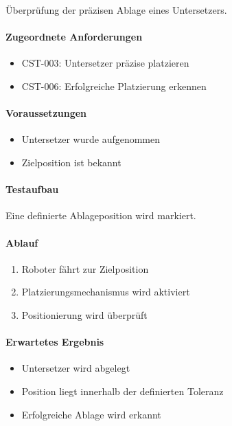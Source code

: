 Überprüfung der präzisen Ablage eines Untersetzers.

\paragraph{Zugeordnete
Anforderungen}\label{zugeordnete-anforderungen-29}

\begin{itemize}
\tightlist
\item
  CST-003: Untersetzer präzise platzieren
\item
  CST-006: Erfolgreiche Platzierung erkennen
\end{itemize}

\paragraph{Voraussetzungen}\label{voraussetzungen-28}

\begin{itemize}
\tightlist
\item
  Untersetzer wurde aufgenommen
\item
  Zielposition ist bekannt
\end{itemize}

\paragraph{Testaufbau}\label{testaufbau-5}

Eine definierte Ablageposition wird markiert.

\paragraph{Ablauf}\label{ablauf-29}

\begin{enumerate}
\def\labelenumi{\arabic{enumi}.}
\tightlist
\item
  Roboter fährt zur Zielposition
\item
  Platzierungsmechanismus wird aktiviert
\item
  Positionierung wird überprüft
\end{enumerate}

\paragraph{Erwartetes Ergebnis}\label{erwartetes-ergebnis-29}

\begin{itemize}
\tightlist
\item
  Untersetzer wird abgelegt
\item
  Position liegt innerhalb der definierten Toleranz
\item
  Erfolgreiche Ablage wird erkannt
\end{itemize}

